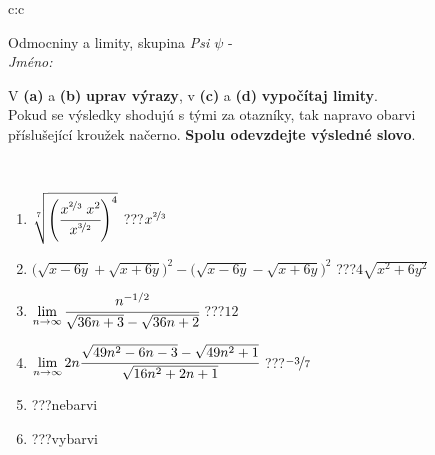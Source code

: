 \documentclass[10pt]{report}
\begin{document}
\newpage
\thispagestyle{empty}
\begin{tabular}{c:c}
\begin{minipage}[c][104.5mm][t]{0.5\linewidth}
\begin{center}
\vspace{7mm}
{\huge Odmocniny a limity, skupina \textit{Psi $\psi$} -}\\[5mm]
\textit{Jméno:}\phantom{xxxxxxxxxxxxxxxxxxxxxxxxxxxxxxxxxxxxxxxxxxxxxxxxxxxxxxxxxxxxxxxxx}\\[5mm]
\begin{minipage}{0.95\linewidth}
\begin{center}
V \textbf{(a)} a \textbf{(b)} \textbf{uprav výrazy}, v \textbf{(c)} a \textbf{(d)} \textbf{vypočítaj limity}.\\Pokud se výsledky shodujú s tými za otazníky, tak napravo obarvi\\příslušející kroužek načerno. \textbf{Spolu odevzdejte výsledné slovo}.
\end{center}
\end{minipage}
\\[1mm]
\begin{minipage}{0.79\linewidth}
\begin{center}
\begin{varwidth}{\linewidth}
\begin{enumerate}
\small
\item $\sqrt[7]{\left(\cfrac{x^{\nicefrac{2}{3}}\;x^{2}}{x^{\nicefrac{3}{2}}}\right)^{4}}$\quad \dotfill\; ???\;\dotfill \quad $x^{\nicefrac{2}{3}}$
\item {\footnotesize{\scriptsize$\big(\sqrt{x-6y}+\sqrt{x+6y}\big)^2-\big(\sqrt{x-6y}-\sqrt{x+6y}\big)^2$}\quad \dotfill\; ???\;\dotfill \quad $4\sqrt{x^2+6y^2}$}
\item $\lim\limits_{n\to\infty}\cfrac{n^{-1/2}}{\sqrt{36n+3}-\sqrt{36n+2}}$\quad \dotfill\; ???\;\dotfill \quad $12$
\item $\lim\limits_{n\to\infty}2n\cfrac{\sqrt{49n^2-6n-3}-\sqrt{49n^2+1}}{\sqrt{16n^2+2n+1}}$\quad \dotfill\; ???\;\dotfill \quad $\nicefrac{-3}{7}$
\item \quad \dotfill\; ???\;\dotfill \quad nebarvi
\item \quad \dotfill\; ???\;\dotfill \quad vybarvi
\end{enumerate}
\end{varwidth}
\end{center}
\end{minipage}
\begin{minipage}{0.20\linewidth}

\end{minipage}
\end{center}
\end{minipage}
\end{tabular}
\end{document}
